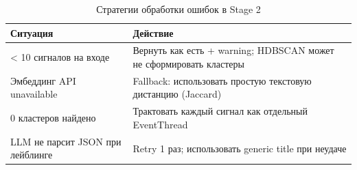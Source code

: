 \begin{table}[h!]
\centering
\caption{Стратегии обработки ошибок в Stage 2}
\label{tab:stage2_errors}
\footnotesize
\begin{tabular}{|l|l|}
\hline
\textbf{Ситуация} & \textbf{Действие} \\
\hline
< 10 сигналов на входе & Вернуть как есть + warning; HDBSCAN может не сформировать кластеры \\
Эмбеддинг API unavailable & Fallback: использовать простую текстовую дистанцию (Jaccard) \\
0 кластеров найдено & Трактовать каждый сигнал как отдельный EventThread \\
LLM не парсит JSON при лейблинге & Retry 1 раз; использовать generic title при неудаче \\
\hline
\end{tabular}
\end{table}

